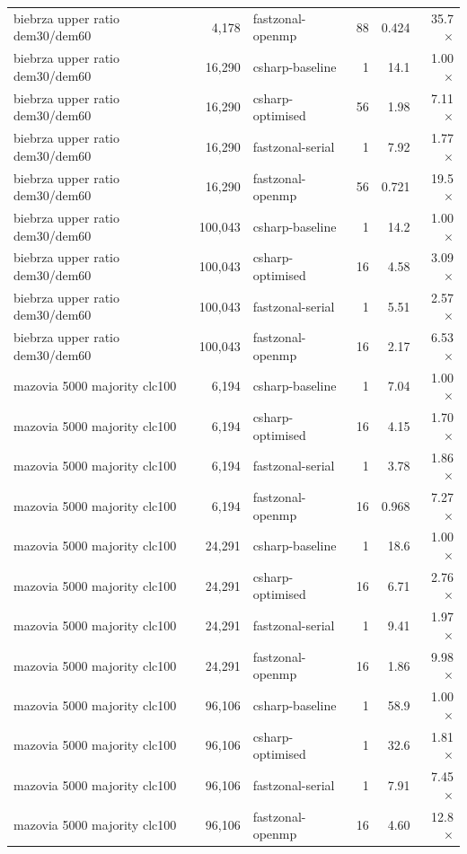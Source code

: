 \begin{tabular}{lrlrrr}
biebrza upper ratio dem30/dem60 & 4,178 & fastzonal-openmp & 88 & 0.424 & 35.7$\times$ \\
biebrza upper ratio dem30/dem60 & 16,290 & csharp-baseline & 1 & 14.1 & 1.00$\times$ \\
biebrza upper ratio dem30/dem60 & 16,290 & csharp-optimised & 56 & 1.98 & 7.11$\times$ \\
biebrza upper ratio dem30/dem60 & 16,290 & fastzonal-serial & 1 & 7.92 & 1.77$\times$ \\
biebrza upper ratio dem30/dem60 & 16,290 & fastzonal-openmp & 56 & 0.721 & 19.5$\times$ \\
biebrza upper ratio dem30/dem60 & 100,043 & csharp-baseline & 1 & 14.2 & 1.00$\times$ \\
biebrza upper ratio dem30/dem60 & 100,043 & csharp-optimised & 16 & 4.58 & 3.09$\times$ \\
biebrza upper ratio dem30/dem60 & 100,043 & fastzonal-serial & 1 & 5.51 & 2.57$\times$ \\
biebrza upper ratio dem30/dem60 & 100,043 & fastzonal-openmp & 16 & 2.17 & 6.53$\times$ \\
mazovia 5000 majority clc100 & 6,194 & csharp-baseline & 1 & 7.04 & 1.00$\times$ \\
mazovia 5000 majority clc100 & 6,194 & csharp-optimised & 16 & 4.15 & 1.70$\times$ \\
mazovia 5000 majority clc100 & 6,194 & fastzonal-serial & 1 & 3.78 & 1.86$\times$ \\
mazovia 5000 majority clc100 & 6,194 & fastzonal-openmp & 16 & 0.968 & 7.27$\times$ \\
mazovia 5000 majority clc100 & 24,291 & csharp-baseline & 1 & 18.6 & 1.00$\times$ \\
mazovia 5000 majority clc100 & 24,291 & csharp-optimised & 16 & 6.71 & 2.76$\times$ \\
mazovia 5000 majority clc100 & 24,291 & fastzonal-serial & 1 & 9.41 & 1.97$\times$ \\
mazovia 5000 majority clc100 & 24,291 & fastzonal-openmp & 16 & 1.86 & 9.98$\times$ \\
mazovia 5000 majority clc100 & 96,106 & csharp-baseline & 1 & 58.9 & 1.00$\times$ \\
mazovia 5000 majority clc100 & 96,106 & csharp-optimised & 1 & 32.6 & 1.81$\times$ \\
mazovia 5000 majority clc100 & 96,106 & fastzonal-serial & 1 & 7.91 & 7.45$\times$ \\
mazovia 5000 majority clc100 & 96,106 & fastzonal-openmp & 16 & 4.60 & 12.8$\times$ \\

\end{tabular}
